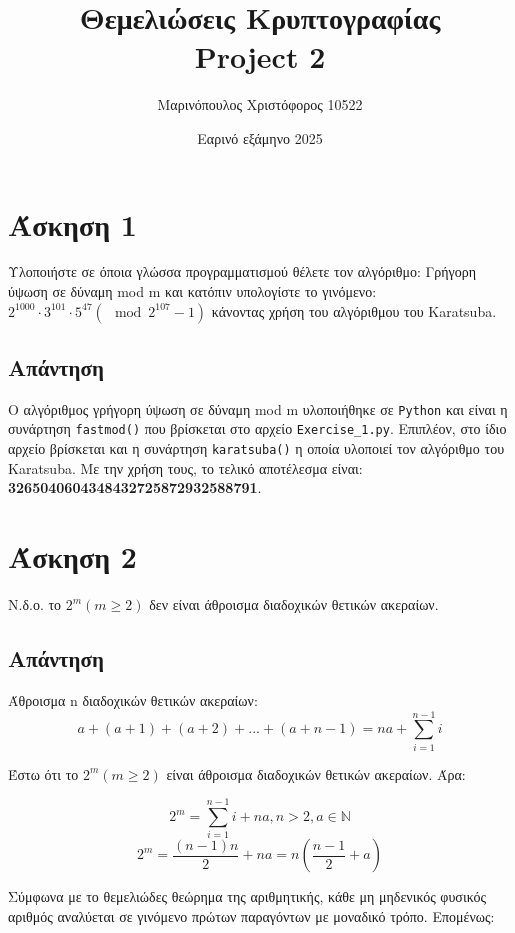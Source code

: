 \documentclass[12pt]{article}
\title{\vspace{-2cm} Θεμελιώσεις Κρυπτογραφίας \\
        Project 2}
\author{Μαρινόπουλος Χριστόφορος 10522}
\date{Εαρινό εξάμηνο 2025}
\begin{document}
\maketitle
\renewcommand{\contentsname}{Περιεχόμενα}
\tableofcontents
\newpage
\section*{Άσκηση 1}

Υλοποιήστε σε όποια γλώσσα προγραμματισμού θέλετε τον αλγόριθμο:  Γρήγορη ύψωση σε δύναμη mod m και κατόπιν υπολογίστε το γινόμενο: \( 2^{1000} \cdot 3^{101} \cdot 5^{47} (\mod{2^{107} -1}) \) κάνοντας χρήση του αλγόριθμου του Karatsuba.
\subsection*{Απάντηση}

Ο αλγόριθμος γρήγορη ύψωση σε δύναμη mod m υλοποιήθηκε σε \texttt{Python} και είναι η συνάρτηση \texttt{fastmod()} που βρίσκεται στο αρχείο \texttt{Exercise\_1.py}. Επιπλέον, στο ίδιο αρχείο βρίσκεται και η συνάρτηση \texttt{karatsuba()} η οποία υλοποιεί τον αλγόριθμο του Karatsuba.
\newline
\newline
Με την χρήση τους, το τελικό αποτέλεσμα είναι: \textbf{3265040604348432725872932588791}.
\hfill \blacksquare

\section*{Άσκηση 2}
Ν.δ.ο. το \( 2^m (m \ge 2) \) δεν είναι άθροισμα διαδοχικών θετικών ακεραίων.


\subsection*{Απάντηση}
Άθροισμα n διαδοχικών θετικών ακεραίων:
\[
a + (a+1) + (a+2) + ... + (a+n-1) = na + \sum_{i=1}^{n-1}i
\]

Έστω ότι το \( 2^m (m \ge 2) \) είναι άθροισμα διαδοχικών θετικών ακεραίων. Άρα:

\[
2^m = \sum_{i=1}^{n-1} i + na, n > 2, a \in \mathbb{N}
\]
\[
2^m = \frac{(n-1)n}{2} + na = n(\frac{n-1}{2} + a)
\]

Σύμφωνα με το θεμελιώδες θεώρημα της αριθμητικής, κάθε μη μηδενικός φυσικός αριθμός αναλύεται σε γινόμενο πρώτων παραγόντων με μοναδικό τρόπο. Επομένως:
\end{document}
